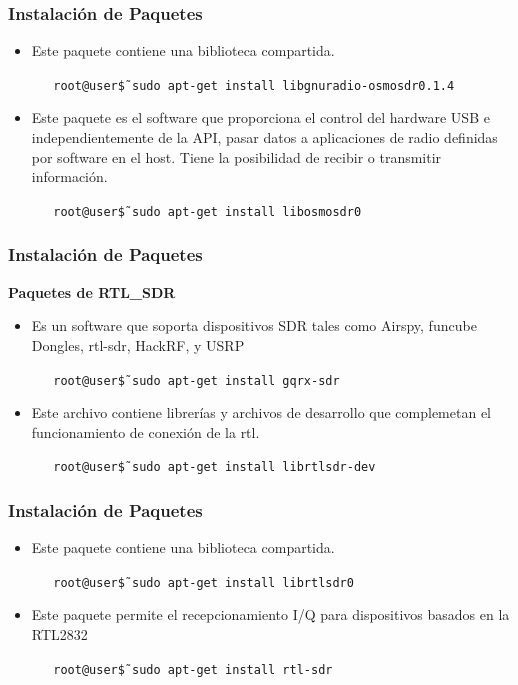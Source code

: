 \begin{frame}
\frametitle{Instalación de Paquetes}

\begin{itemize}
    \item {Este paquete contiene una biblioteca compartida.
    \begin{block}{}
    \texttt
    {\ \ \ root@user\~\$ sudo apt-get install libgnuradio-osmosdr0.1.4}
    \end{block}}
    
    \item{Este paquete es el software que proporciona el control del hardware USB e independientemente de la API, pasar datos a aplicaciones de radio definidas por software en el host. Tiene la posibilidad de recibir o transmitir información.
    \begin{block}{}
    \texttt
    {\ \ \ root@user\~\$ sudo apt-get install libosmosdr0}
    \end{block}}
\end{itemize}

\end{frame}

\begin{frame}
\frametitle{Instalación de Paquetes}
\textbf{Paquetes de RTL\_SDR}
\begin{itemize}
 
    \item { Es un software que soporta dispositivos SDR tales como Airspy, funcube Dongles, rtl-sdr, HackRF, y USRP
    \begin{block}{}
    \texttt
    {\ \ \ root@user\~\$ sudo apt-get install gqrx-sdr}
    \end{block}}
     \item { Este archivo contiene librerías y archivos de desarrollo que complemetan el funcionamiento de conexión de la rtl.
    \begin{block}{}
    \texttt
    {\ \ \ root@user\~\$ sudo apt-get install librtlsdr-dev}
    \end{block}}
\end{itemize}

\end{frame}

\begin{frame}
\frametitle{Instalación de Paquetes}
\begin{itemize}
 
    \item {Este paquete contiene una biblioteca compartida.
    \begin{block}{}
    \texttt
    {\ \ \ root@user\~\$ sudo apt-get install librtlsdr0}
    \end{block}}
    \item {Este paquete permite el recepcionamiento I/Q para dispositivos basados en la RTL2832 
    \begin{block}{}
    \texttt
    {\ \ \ root@user\~\$ sudo apt-get install rtl-sdr}
    \end{block}}
\end{itemize}

\end{frame}

